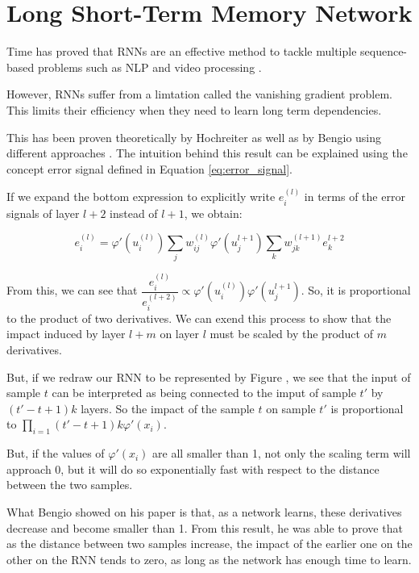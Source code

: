 \section{Long Short-Term Memory Network}\label{sec:lstm}

Time has proved that RNNs are an effective method to tackle multiple sequence-based problems such as NLP \cite{tarwani2017survey} and video processing \cite{yadav2022survey}.

However, RNNs suffer from a limtation called the vanishing gradient problem.
This limits their efficiency when they need to learn long term dependencies.

This has been proven theoretically by Hochreiter \cite{hochreiter1998vanishing} as well as by Bengio using different approaches \cite{bengio1993problem}.
The intuition behind this result can be explained using the concept error signal defined in Equation \ref{eq:error_signal}.

If we expand the bottom expression to explicitly write $e_i^{(l)}$ in terms of the error signals of layer $l+2$ instead of $l+1$, we obtain:

$$
    e_i^{(l)} = \varphi '(u_i^{(l)}) \sum_j w_{ij}^{(l)} \varphi '(u_j^{l+1}) \sum_k w_{jk}^{(l+1)} e_k^{l+2}
$$

From this, we can see that $\dfrac{e_i^{(l)}}{e_i^{(l+2)}} \propto \varphi '(u_i^{(l)})\varphi '(u_j^{l+1})$.
So, it is proportional to the product of two derivatives.
We can exend this process to show that the impact induced by layer $l + m$ on layer $l$ must be scaled by the product of $m$ derivatives.

But, if we redraw our RNN to be represented by Figure , we see that the input of sample $t$ can be interpreted as being connected to the imput of sample $t'$ by $(t'-t+1)k$ layers.
So the impact of the sample $t$ on sample $t'$ is proportional to $\prod_{i=1}{(t'-t+1)k}\varphi'(x_i)$.

But, if the values of $\varphi'(x_i)$ are all smaller than 1, not only the scaling term will approach 0, but it will do so exponentially fast with respect to the distance between the two samples.

What Bengio showed on his paper \cite{bengio1993problem} is that, as a network learns, these derivatives decrease and become smaller than 1.
From this result, he was able to prove that as the distance between two samples increase, the impact of the earlier one on the other on the RNN tends to zero, as long as the network has enough time to learn.

